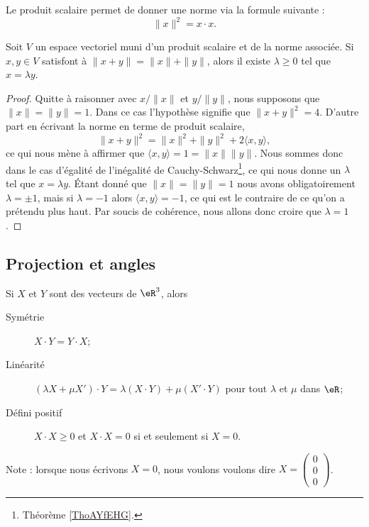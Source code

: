 Le produit scalaire permet de donner une norme via la formule suivante :
\begin{equation}
    \| x \|^2=x\cdot x.
\end{equation}

\begin{lemma}   \label{LemLPOHUme}
    Soit \( V\) un espace vectoriel muni d'un produit scalaire et de la norme associée. Si \( x,y\in V\) satisfont à \( \| x+y \|=\| x \|+\| y \|\), alors il existe \( \lambda\geq 0\) tel que \( x=\lambda y\).
\end{lemma}

\begin{proof}
    Quitte à raisonner avec \( x/\| x \|\) et \( y/\| y \|\), nous supposons que \( \| x \|=\| y \|=1\). Dans ce cas l'hypothèse signifie que \( \| x+y \|^2=4\). D'autre part en écrivant la norme en terme de produit scalaire,
    \begin{equation}
        \| x+y \|^2=\| x \|^2+\| y \|^2+2\langle x, y\rangle ,
    \end{equation}
    ce qui nous mène à affirmer que \( \langle x, y\rangle =1=\| x \|\| y \|\). Nous sommes donc dans le cas d'égalité de l'inégalité de Cauchy-Schwarz\footnote{Théorème \ref{ThoAYfEHG}.}, ce qui nous donne un \( \lambda\) tel que \( x=\lambda y\). Étant donné que \( \| x \|=\| y \|=1\) nous avons obligatoirement \( \lambda=\pm 1\), mais si \( \lambda=-1\) alors \( \langle x, y\rangle =-1\), ce qui est le contraire de ce qu'on a prétendu plus haut. Par soucis de cohérence, nous allons donc croire que \( \lambda=1\).
\end{proof}

\subsection{Projection et angles}

\begin{proposition}
	Si $X$ et $Y$ sont des vecteurs de $\eR^3$, alors
	\begin{description}
		\item[Symétrie] $X\cdot Y=Y\cdot X$;
		\item[Linéarité] $(\lambda X+\mu X')\cdot Y=\lambda(X\cdot Y)+\mu(X'\cdot Y)$ pour tout $\lambda$ et $\mu$ dans $\eR$;
		\item[Défini positif] $X\cdot X\geq 0$ et $X\cdot X=0$ si et seulement si $X=0$.
	\end{description}
\end{proposition}
Note : lorsque nous écrivons $X=0$, nous voulons voulons dire $X=\begin{pmatrix}
	0	\\ 
	0	\\ 
	0	
\end{pmatrix}$.


